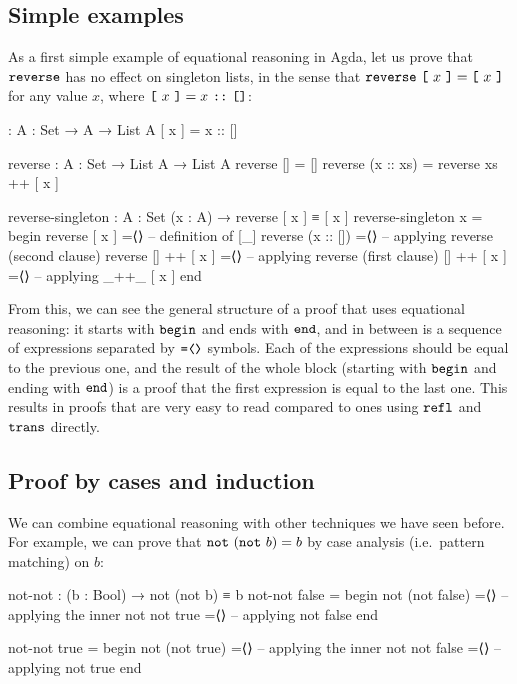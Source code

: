 \documentclass[a4paper,UKenglish]{tufte-handout}
\theoremstyle{definition}
\newcommand\fun[1]{{\AgdaFunction{#1}}}
\newcommand\con[1]{{\AgdaInductiveConstructor{#1}}}
\newcommand\nil{\con{[]}}
\newcommand\cons{\con{::}}
\newcommand\refl{\con{refl}}
\begin{document}
\subsection{Simple examples}

As a first simple example of equational reasoning in Agda, let us
prove that $\fun{reverse}$ has no effect on singleton lists, in the
sense that $\fun{reverse}\ \fun{[}\ x\ \fun{]} = \fun{[}\ x\
\fun{]}$ for any value $x$, where $\fun{[}\ x\ \fun{]} = x\ \cons\
\nil$:
\begin{AgdaAlign}
\begin{code}[number]
[_] : {A : Set} → A → List A
[ x ] = x :: []

reverse : {A : Set} → List A → List A
reverse [] = []
reverse (x :: xs) = reverse xs ++ [ x ]

reverse-singleton : {A : Set} (x : A) → reverse [ x ] ≡ [ x ]
reverse-singleton x =
  begin
    reverse [ x ]
  =⟨⟩                       --  definition of [_]
    reverse (x :: [])
  =⟨⟩                       --  applying reverse (second clause)
    reverse [] ++ [ x ]
  =⟨⟩                       --  applying reverse (first clause)
    [] ++ [ x ]
  =⟨⟩                       --  applying _++_
    [ x ]
  end
\end{code}
\end{AgdaAlign}
From this, we can see the general structure of a proof that uses
equational reasoning: it starts with $\fun{begin}$ and ends with
$\fun{end}$, and in between is a sequence of expressions separated by
$\fun{=⟨⟩}$ symbols. Each of the expressions should be equal to the
previous one, and the result of the whole block (starting with
$\fun{begin}$ and ending with $\fun{end}$) is a proof that the first
expression is equal to the last one. This results in proofs that are
very easy to read compared to ones using $\refl$ and $\fun{trans}$
directly.

\subsection{Proof by cases and induction}

We can combine equational reasoning with other techniques we have seen
before. For example, we can prove that $\fun{not}\ (\fun{not}\ b) = b$
by case analysis (i.e.~pattern matching) on $b$:
\begin{code}[number]
not-not : (b : Bool) → not (not b) ≡ b
not-not false =
  begin
    not (not false)
  =⟨⟩                -- applying the inner not
    not true
  =⟨⟩                -- applying not
    false
  end
\end{code}
\begin{code}[number]
not-not true =
  begin
    not (not true)
  =⟨⟩                -- applying the inner not
    not false
  =⟨⟩                -- applying not
    true
  end
\end{code}
\end{document}
